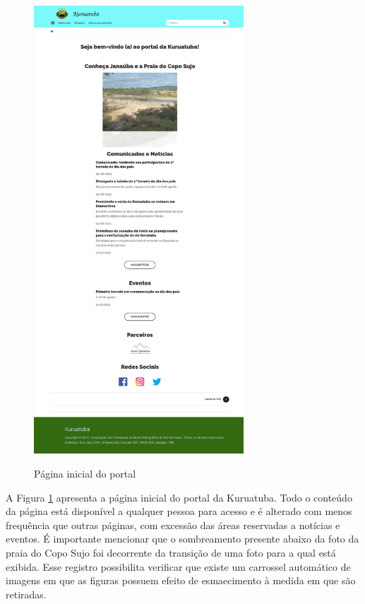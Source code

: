 \begin{figure}[htb]
 \centering
 \caption{Página inicial do portal}
 \includegraphics[width=0.7\textwidth]{figuras/kuruatuba_portal_home.png}
 \label{fig:home-portal}
\end{figure}

A Figura \ref{fig:home-portal} apresenta a página inicial do portal da Kuruatuba. Todo o conteúdo da página está disponível a qualquer pessoa para acesso e é alterado com menos frequência que outras páginas, com excessão das áreas reservadas a notícias e eventos. É importante mencionar que o sombreamento presente abaixo da foto da praia do Copo Sujo foi decorrente da transição de uma foto para a qual está exibida. Esse registro possibilita verificar que existe um carrossel automático de imagens em que as figuras possuem efeito de esmaecimento à medida em que são retiradas.

